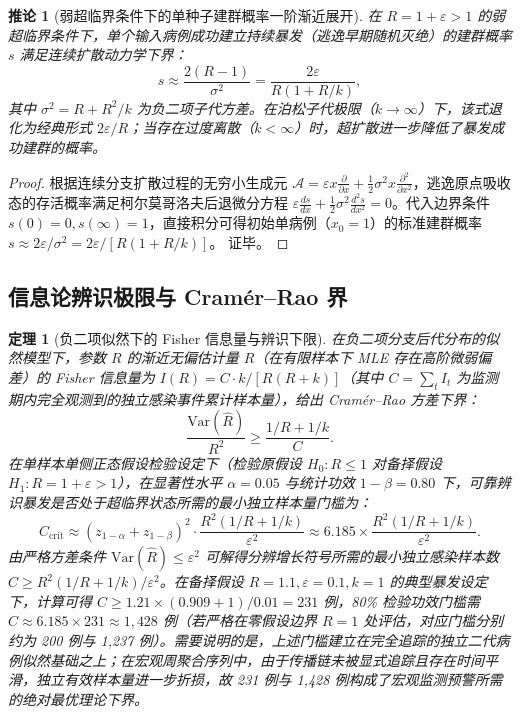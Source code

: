 \documentclass[11pt,a4paper]{article}
\theoremstyle{plain}
\newtheorem{theorem}{定理}
\newtheorem{corollary}{推论}
\theoremstyle{definition}
\begin{document}
\begin{corollary}[弱超临界条件下的单种子建群概率一阶渐近展开]\label{cor:establishment}
在 $R = 1 + \varepsilon > 1$ 的弱超临界条件下，单个输入病例成功建立持续暴发（逃逸早期随机灭绝）的建群概率 $s$ 满足连续扩散动力学下界：
\begin{equation}
s \approx \frac{2(R-1)}{\sigma^2} = \frac{2\varepsilon}{R(1 + R/k)},
\label{eq:establishment_prob}
\end{equation}
其中 $\sigma^2 = R + R^2/k$ 为负二项子代方差。在泊松子代极限（$k \to \infty$）下，该式退化为经典形式 $2\varepsilon/R$；当存在过度离散（$k < \infty$）时，超扩散进一步降低了暴发成功建群的概率。
\end{corollary}

\begin{proof}
根据连续分支扩散过程的无穷小生成元 $\mathcal{A} = \varepsilon x \frac{\partial}{\partial x} + \frac{1}{2} \sigma^2 x \frac{\partial^2}{\partial x^2}$，逃逸原点吸收态的存活概率满足柯尔莫哥洛夫后退微分方程 $\varepsilon \frac{ds}{dx} + \frac{1}{2} \sigma^2 \frac{d^2s}{dx^2} = 0$。代入边界条件 $s(0)=0, s(\infty)=1$，直接积分可得初始单病例（$x_0 = 1$）的标准建群概率 $s \approx 2\varepsilon/\sigma^2 = 2\varepsilon/[R(1 + R/k)]$。
证毕。
\end{proof}

\subsection{信息论辨识极限与 Cram\'er--Rao 界}

\begin{theorem}[负二项似然下的 Fisher 信息量与辨识下限]\label{thm:fisher}
在负二项分支后代分布的似然模型下，参数 $R$ 的渐近无偏估计量 $\hat{R}$（在有限样本下 MLE 存在高阶微弱偏差）的 Fisher 信息量为 $I(R) = C \cdot k / [R(R+k)]$（其中 $C = \sum_t I_t$ 为监测期内完全观测到的独立感染事件累计样本量），给出 Cram\'er--Rao 方差下界：
\begin{equation}
\frac{\text{Var}(\hat{R})}{R^2} \ge \frac{1/R + 1/k}{C}.
\label{eq:cramer_cn}
\end{equation}
在单样本单侧正态假设检验设定下（检验原假设 $H_0: R \le 1$ 对备择假设 $H_1: R = 1 + \varepsilon > 1$），在显著性水平 $\alpha = 0.05$ 与统计功效 $1 - \beta = 0.80$ 下，可靠辨识暴发是否处于超临界状态所需的最小独立样本量门槛为：
\begin{equation}
C_{\text{crit}} \approx (z_{1-\alpha} + z_{1-\beta})^2 \cdot \frac{R^2(1/R + 1/k)}{\varepsilon^2} \approx 6.185 \times \frac{R^2(1/R + 1/k)}{\varepsilon^2}.
\end{equation}
由严格方差条件 $\text{Var}(\hat{R}) \le \varepsilon^2$ 可解得分辨增长符号所需的最小独立感染样本数 $C \ge R^2(1/R + 1/k)/\varepsilon^2$。在备择假设 $R = 1.1, \varepsilon = 0.1, k = 1$ 的典型暴发设定下，计算可得 $C \ge 1.21 \times (0.909 + 1)/0.01 = 231$ 例，80\% 检验功效门槛需 $C \approx 6.185 \times 231 \approx 1,428$ 例（若严格在零假设边界 $R=1$ 处评估，对应门槛分别约为 200 例与 1,237 例）。需要说明的是，上述门槛建立在完全追踪的独立二代病例似然基础之上；在宏观周聚合序列中，由于传播链未被显式追踪且存在时间平滑，独立有效样本量进一步折损，故 231 例与 1,428 例构成了宏观监测预警所需的绝对最优理论下界。
\end{theorem}
\end{document}
